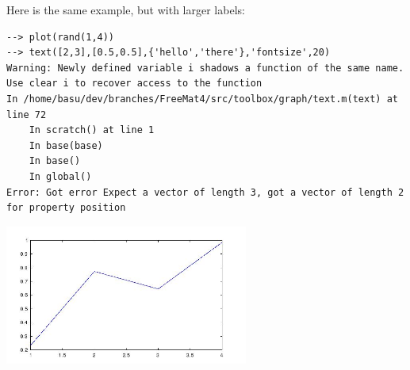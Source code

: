 Here is the same example, but with larger labels:
\begin{verbatim}
--> plot(rand(1,4))
--> text([2,3],[0.5,0.5],{'hello','there'},'fontsize',20)
Warning: Newly defined variable i shadows a function of the same name.  Use clear i to recover access to the function
In /home/basu/dev/branches/FreeMat4/src/toolbox/graph/text.m(text) at line 72
    In scratch() at line 1
    In base(base)
    In base()
    In global()
Error: Got error Expect a vector of length 3, got a vector of length 2 for property position
\end{verbatim}


\centerline{\includegraphics[width=8cm]{text2}}

